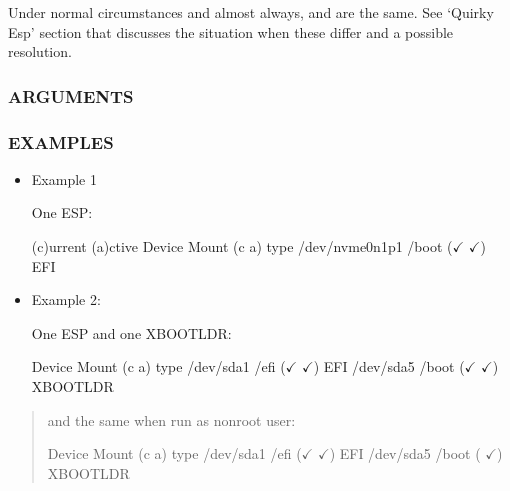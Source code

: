 \documentclass[letterpaper,11pt,english]{sphinxmanual}
\begin{document}
\sphinxAtStartPar
Under normal circumstances and almost always,   and  are the same.
See ‘Quirky Esp’ section that discusses the situation when these differ and
a possible resolution.


\subsubsection{ARGUMENTS}
\label{\detokenize{_build/man-ready/sd-boot-find-boot-mounts.8:arguments}}
\sphinxAtStartPar
{}


\subsubsection{EXAMPLES}
\label{\detokenize{_build/man-ready/sd-boot-find-boot-mounts.8:examples}}\begin{itemize}
\item {} 
\sphinxAtStartPar
Example 1

\sphinxAtStartPar
One ESP:

\begin{sphinxVerbatim}[commandchars=\\\{\}]
                                              (c)urrent (a)ctive
        Device Mount                          (c a) type
/dev/nvme0n1p1 /boot                          (\(\pmb{\checkmark}\) \(\pmb{\checkmark}\)) EFI
\end{sphinxVerbatim}

\item {} 
\sphinxAtStartPar
Example 2:

\sphinxAtStartPar
One ESP and one XBOOTLDR:

\begin{sphinxVerbatim}[commandchars=\\\{\}]
   Device Mount                          (c a) type
/dev/sda1 /efi                           (\(\pmb{\checkmark}\) \(\pmb{\checkmark}\)) EFI
/dev/sda5 /boot                          (\(\pmb{\checkmark}\) \(\pmb{\checkmark}\)) XBOOTLDR
\end{sphinxVerbatim}

\end{itemize}
\begin{quote}

\sphinxAtStartPar
and the same when run as non\sphinxhyphen{}root user:

\begin{sphinxVerbatim}[commandchars=\\\{\}]
   Device Mount                          (c a) type
/dev/sda1 /efi                           (\(\pmb{\checkmark}\) \(\pmb{\checkmark}\)) EFI
/dev/sda5 /boot                          (  \(\pmb{\checkmark}\)) XBOOTLDR
\end{sphinxVerbatim}
\end{quote}
\end{document}
